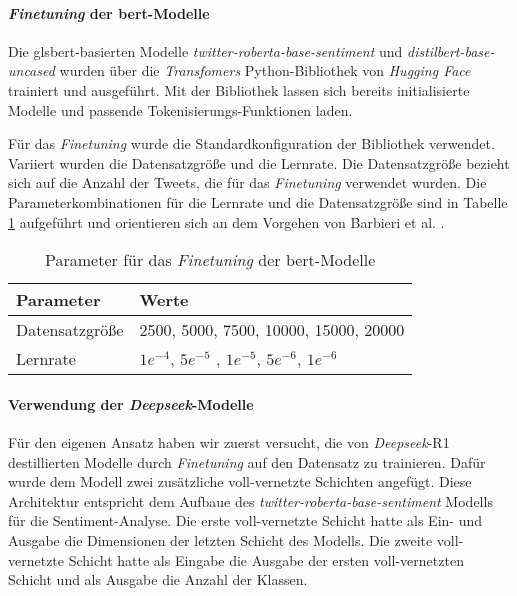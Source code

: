 \paragraph{\textit{Finetuning} der \gls{bert}-Modelle}

Die gls{bert}-basierten Modelle \textit{twitter-roberta-base-sentiment} und \textit{distilbert-base-uncased} wurden über die \textit{Transfomers} Python-Bibliothek von \textit{Hugging Face} trainiert und ausgeführt.
Mit der Bibliothek lassen sich bereits initialisierte Modelle und passende Tokenisierungs-Funktionen laden.

Für das \textit{Finetuning} wurde die Standardkonfiguration der Bibliothek verwendet.
Variiert wurden die Datensatzgröße und die Lernrate.
Die Datensatzgröße bezieht sich auf die Anzahl der Tweets, die für das \textit{Finetuning} verwendet wurden.
Die Parameterkombinationen für die Lernrate und die Datensatzgröße sind in Tabelle \ref{tab:dl-params} aufgeführt und orientieren sich an dem Vorgehen von Barbieri et al. \cite{barbieri2020tweeteval}.
\begin{table}
    \begin{tabular}{ll}
        \toprule
        Parameter       & Werte                                                   \\
        \midrule
        Datensatzgröße  & 2500, 5000, 7500, 10000, 15000, 20000                   \\
        Lernrate        & $1e^{-4}$, $5e^{-5}$ , $1e^{-5}$, $5e^{-6}$, $1e^{-6}$  \\
        \bottomrule
    \end{tabular}
    \caption{Parameter für das \textit{Finetuning} der \gls{bert}-Modelle}
    \label{tab:dl-params}
\end{table}

\paragraph{Verwendung der \textit{Deepseek}-Modelle}

Für den eigenen Ansatz haben wir zuerst versucht, die von \textit{Deepseek}-R1 destillierten Modelle durch \textit{Finetuning} auf den Datensatz zu trainieren.
Dafür wurde dem Modell zwei zusätzliche voll-vernetzte Schichten angefügt.
Diese Architektur entspricht dem Aufbaue des \textit{twitter-roberta-base-sentiment} Modells für die Sentiment-Analyse.
Die erste voll-vernetzte Schicht hatte als Ein- und Ausgabe die Dimensionen der letzten Schicht des Modells.
Die zweite voll-vernetzte Schicht hatte als Eingabe die Ausgabe der ersten voll-vernetzten Schicht und als Ausgabe die Anzahl der Klassen.

